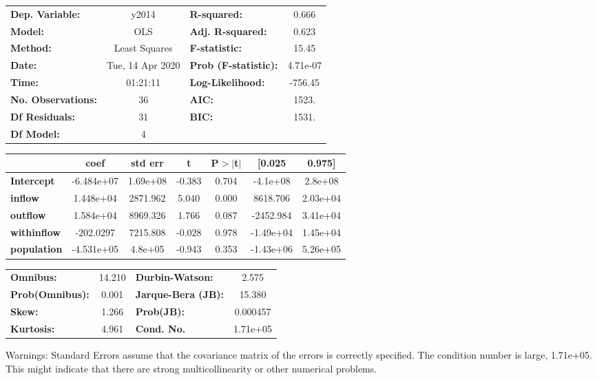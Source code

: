 \begin{center}
\begin{tabular}{lclc}
\toprule
\textbf{Dep. Variable:}    &      y2014       & \textbf{  R-squared:         } &     0.666   \\
\textbf{Model:}            &       OLS        & \textbf{  Adj. R-squared:    } &     0.623   \\
\textbf{Method:}           &  Least Squares   & \textbf{  F-statistic:       } &     15.45   \\
\textbf{Date:}             & Tue, 14 Apr 2020 & \textbf{  Prob (F-statistic):} &  4.71e-07   \\
\textbf{Time:}             &     01:21:11     & \textbf{  Log-Likelihood:    } &   -756.45   \\
\textbf{No. Observations:} &          36      & \textbf{  AIC:               } &     1523.   \\
\textbf{Df Residuals:}     &          31      & \textbf{  BIC:               } &     1531.   \\
\textbf{Df Model:}         &           4      & \textbf{                     } &             \\
\bottomrule
\end{tabular}
\begin{tabular}{lcccccc}
                    & \textbf{coef} & \textbf{std err} & \textbf{t} & \textbf{P$> |$t$|$} & \textbf{[0.025} & \textbf{0.975]}  \\
\midrule
\textbf{Intercept}  &   -6.484e+07  &     1.69e+08     &    -0.383  &         0.704        &     -4.1e+08    &      2.8e+08     \\
\textbf{inflow}     &    1.448e+04  &     2871.962     &     5.040  &         0.000        &     8618.706    &     2.03e+04     \\
\textbf{outflow}    &    1.584e+04  &     8969.326     &     1.766  &         0.087        &    -2452.984    &     3.41e+04     \\
\textbf{withinflow} &    -202.0297  &     7215.808     &    -0.028  &         0.978        &    -1.49e+04    &     1.45e+04     \\
\textbf{population} &   -4.531e+05  &      4.8e+05     &    -0.943  &         0.353        &    -1.43e+06    &     5.26e+05     \\
\bottomrule
\end{tabular}
\begin{tabular}{lclc}
\textbf{Omnibus:}       & 14.210 & \textbf{  Durbin-Watson:     } &    2.575  \\
\textbf{Prob(Omnibus):} &  0.001 & \textbf{  Jarque-Bera (JB):  } &   15.380  \\
\textbf{Skew:}          &  1.266 & \textbf{  Prob(JB):          } & 0.000457  \\
\textbf{Kurtosis:}      &  4.961 & \textbf{  Cond. No.          } & 1.71e+05  \\
\bottomrule
\end{tabular}
\end{center}

Warnings: \newline
 [1] Standard Errors assume that the covariance matrix of the errors is correctly specified. \newline
 [2] The condition number is large, 1.71e+05. This might indicate that there are \newline
 strong multicollinearity or other numerical problems.